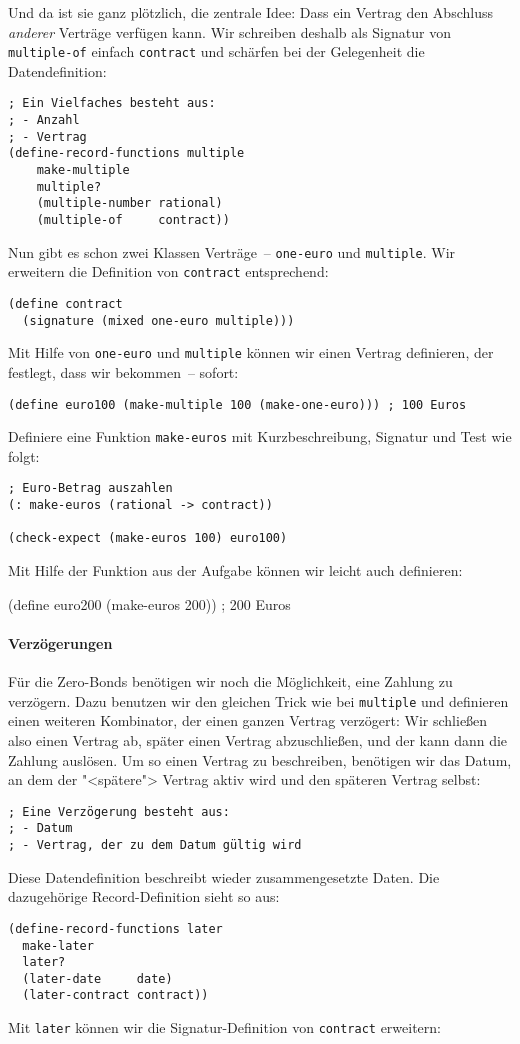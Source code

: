 Und da ist sie ganz plötzlich, die zentrale Idee: Dass ein Vertrag den
Abschluss \emph{anderer} Verträge verfügen kann.  Wir schreiben
deshalb als Signatur von \lstinline{multiple-of} einfach
\lstinline{contract} und schärfen bei der Gelegenheit die Datendefinition:
%
\begin{lstlisting}
; Ein Vielfaches besteht aus:
; - Anzahl
; - Vertrag 
(define-record-functions multiple
    make-multiple
    multiple?
    (multiple-number rational)
    (multiple-of     contract))
\end{lstlisting}
%
Nun gibt es schon zwei Klassen Verträge~-- \lstinline{one-euro} und
\lstinline{multiple}.  Wir erweitern die Definition von
\lstinline{contract} entsprechend:
%
\begin{lstlisting}
(define contract
  (signature (mixed one-euro multiple)))
\end{lstlisting}
%
Mit Hilfe von \lstinline{one-euro} und \lstinline{multiple} können wir
einen Vertrag definieren, der festlegt, dass wir  bekommen~--
sofort:
%
\begin{lstlisting}
(define euro100 (make-multiple 100 (make-one-euro))) ; 100 Euros
\end{lstlisting}
%
\begin{aufgabe}
  Definiere eine Funktion \lstinline{make-euros} mit Kurzbeschreibung,
  Signatur und Test wie folgt:
\begin{lstlisting}
; Euro-Betrag auszahlen
(: make-euros (rational -> contract))

(check-expect (make-euros 100) euro100)
\end{lstlisting}
\end{aufgabe}
%
Mit Hilfe der Funktion aus der Aufgabe können wir leicht auch
 definieren:
%
\begin{lstinline}
(define euro200 (make-euros 200)) ; 200 Euros
\end{lstinline}

\paragraph{Verzögerungen}
Für die Zero-Bonds benötigen wir noch die Möglichkeit,
eine Zahlung zu verzögern.
Dazu benutzen wir den gleichen Trick wie
bei \lstinline{multiple} und definieren einen weiteren Kombinator, der
einen ganzen Vertrag verzögert: Wir schließen also einen Vertrag ab,
später einen Vertrag abzuschließen, und der kann dann die Zahlung
auslösen.  Um so einen Vertrag zu beschreiben, benötigen wir das
Datum, an dem der "<spätere"> Vertrag aktiv wird und den späteren
Vertrag selbst:
%
\begin{lstlisting}
; Eine Verzögerung besteht aus:
; - Datum
; - Vertrag, der zu dem Datum gültig wird
\end{lstlisting}
%
Diese Datendefinition beschreibt wieder zusammengesetzte Daten.  Die
dazugehörige Record-Definition sieht so aus:
%
\begin{lstlisting}
(define-record-functions later
  make-later
  later?
  (later-date     date)
  (later-contract contract))
\end{lstlisting}
%
Mit \lstinline{later} können wir die Signatur-Definition von
\lstinline{contract} erweitern:

